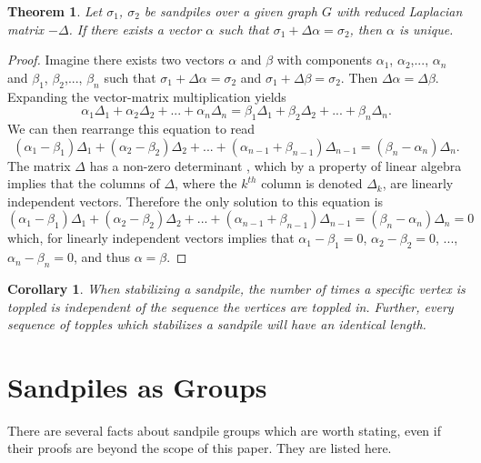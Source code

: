 \documentclass[12pt]{article}
\newtheorem{theorem}{Theorem}
\newtheorem{corollary}{Corollary}
\begin{document}
\begin{theorem}
    Let $\sigma_1$, $\sigma_2$ be sandpiles over a given graph $G$ with reduced Laplacian matrix $-\Delta$.  If there exists a vector $\alpha$ such that $\sigma_1 + \Delta \alpha = \sigma_2$, then $\alpha$ is unique.
\end{theorem}
\begin{proof}
Imagine there exists two vectors $\alpha$ and $\beta$ with components $\alpha_1$, $\alpha_2$,..., $\alpha_n$ and $\beta_1$, $\beta_2$,..., $\beta_n$ such that $\sigma_1 + \Delta \alpha = \sigma_2$ and $\sigma_1 + \Delta \beta = \sigma_2$.  Then $\Delta \alpha = \Delta \beta$.  Expanding the vector-matrix multiplication yields
$$\alpha_1\Delta_1 +\alpha_2\Delta_2 +... +\alpha_n\Delta_n = \beta_1\Delta_1 + \beta_2\Delta_2 + ... + \beta_n\Delta_n.$$
We can then rearrange this equation to read 
$$(\alpha_1-\beta_1)\Delta_1+(\alpha_2-\beta_2)\Delta_2+...+(\alpha_{n-1}+\beta_{n-1})\Delta_{n-1}=(\beta_n-\alpha_n)\Delta_n.$$
The matrix $\Delta$ has a non-zero determinant \cite{glass}, which by a property of linear algebra implies that the columns of $\Delta$, where the $k^{th}$ column is denoted $\Delta_k$, are linearly independent vectors.  Therefore the only solution to this equation is 
$$(\alpha_1-\beta_1)\Delta_1+(\alpha_2-\beta_2)\Delta_2+...+(\alpha_{n-1}+\beta_{n-1})\Delta_{n-1}=(\beta_n-\alpha_n)\Delta_n=0$$
which, for linearly independent vectors implies that $\alpha_1-\beta_1=0$, $\alpha_2-\beta_2=0$, ..., $\alpha_n-\beta_n=0$, and thus $\alpha=\beta$. 
\end{proof}

\begin{corollary}
    When stabilizing a sandpile, the number of times a specific vertex is toppled is independent of the sequence the vertices are toppled in. Further, every sequence of topples which stabilizes a sandpile will have an identical length.
\end{corollary}

\section{Sandpiles as Groups}

There are several facts about sandpile groups which are worth stating, even if their proofs are beyond the scope of this paper.  They are listed here.
\end{document}
